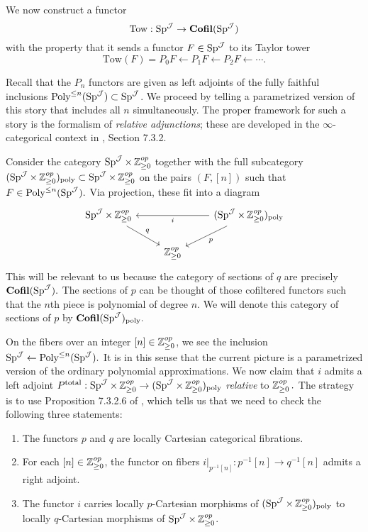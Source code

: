 \begin{cnstr}\label{cnstr:tower}
We now construct a functor $$\text{Tow}: \operatorname{\mathrm{Sp}}^{\operatorname{\mathcal{J}}} \to \operatorname{\mathbf{Cofil}}(\operatorname{\mathrm{Sp}}^{\operatorname{\mathcal{J}}})$$ with the property that it sends a functor $F\in \operatorname{\mathrm{Sp}}^{\operatorname{\mathcal{J}}}$ to its Taylor tower $$\text{Tow}(F) = P_0F \longleftarrow P_1F \longleftarrow P_2F \longleftarrow \cdots.$$


Recall that the $P_n$ functors are given as left adjoints of the fully faithful inclusions $\operatorname{\text{Poly}}^{\leq n}(\operatorname{\mathrm{Sp}}^{\operatorname{\mathcal{J}}}) \subset \operatorname{\mathrm{Sp}}^{\operatorname{\mathcal{J}}}$.  We proceed by telling a parametrized version of this story that includes all $n$ simultaneously.  The proper framework for such a story is the formalism of \emph{relative adjunctions}; these are developed in the $\infty$-categorical context in \cite{HA}, Section 7.3.2.  

Consider the category $\operatorname{\mathrm{Sp}}^{\operatorname{\mathcal{J}}}\times \operatorname{\mathbb{Z}}^{op}_{\geq 0}$ together with the full subcategory $(\operatorname{\mathrm{Sp}}^{\operatorname{\mathcal{J}}}\times \operatorname{\mathbb{Z}}^{op}_{\geq 0})_{\text{poly}} \subset \operatorname{\mathrm{Sp}}^{\operatorname{\mathcal{J}}}\times \operatorname{\mathbb{Z}}^{op}_{\geq 0}$ on the pairs $(F, [n])$ such that $F\in \operatorname{\text{Poly}}^{\leq n}(\operatorname{\mathrm{Sp}}^{\operatorname{\mathcal{J}}}).$  Via projection, these fit into a diagram
$$
\begin{tikzcd}\label{dia:reladj}
\Sp^{\J}\times \Z^{op}_{\geq 0} \arrow[rd,"q"]& &(\Sp^{\J}\times \Z^{op}_{\geq 0})_{\text{poly}} \arrow[ld,"p"]\arrow[ll,"i"]  \\
& \Z^{op}_{\geq 0}
\end{tikzcd}
$$
 This will be relevant to us because the category of sections of $q$ are precisely $\operatorname{\mathbf{Cofil}}(\operatorname{\mathrm{Sp}}^{\operatorname{\mathcal{J}}}).$  The sections of $p$ can be thought of those cofiltered functors such that the $n$th piece is polynomial of degree $n$.  We will denote this category of sections of $p$ by $\operatorname{\mathbf{Cofil}}(\operatorname{\mathrm{Sp}}^{\operatorname{\mathcal{J}}})_{\text{poly}}.$ 

On the fibers over an integer $[n] \in \operatorname{\mathbb{Z}}^{op}_{\geq 0}$, we see the inclusion $\operatorname{\mathrm{Sp}}^{\operatorname{\mathcal{J}}} \leftarrow \operatorname{\text{Poly}}^{\leq n}(\operatorname{\mathrm{Sp}}^{\operatorname{\mathcal{J}}}).$  It is in this sense that the current picture is a parametrized version of the ordinary polynomial approximations.  We now claim that $i$ admits a left adjoint $P^{\text{total}}: \operatorname{\mathrm{Sp}}^{\operatorname{\mathcal{J}}}\times \operatorname{\mathbb{Z}}^{op}_{\geq 0} \to (\operatorname{\mathrm{Sp}}^{\operatorname{\mathcal{J}}}\times \operatorname{\mathbb{Z}}^{op}_{\geq 0})_{\text{poly}}$ \emph{relative} to $\operatorname{\mathbb{Z}}^{op}_{\geq 0}.$    The strategy is to use Proposition 7.3.2.6 of \cite{HA}, which tells us that we need to check the following three statements:
\begin{enumerate}
\item The functors $p$ and $q$ are locally Cartesian categorical fibrations.
\item For each $[n]\in \operatorname{\mathbb{Z}}^{op}_{\geq 0}$, the functor on fibers $i|_{p^{-1}[n]}:p^{-1}[n] \to q^{-1}[n]$ admits a right adjoint.  
\item The functor $i$ carries locally $p$-Cartesian morphisms of $(\operatorname{\mathrm{Sp}}^{\operatorname{\mathcal{J}}}\times \operatorname{\mathbb{Z}}^{op}_{\geq 0})_{\text{poly}}$ to locally $q$-Cartesian morphisms of $\operatorname{\mathrm{Sp}}^{\operatorname{\mathcal{J}}}\times \operatorname{\mathbb{Z}}^{op}_{\geq 0}$.
\end{enumerate}


\end{cnstr}
